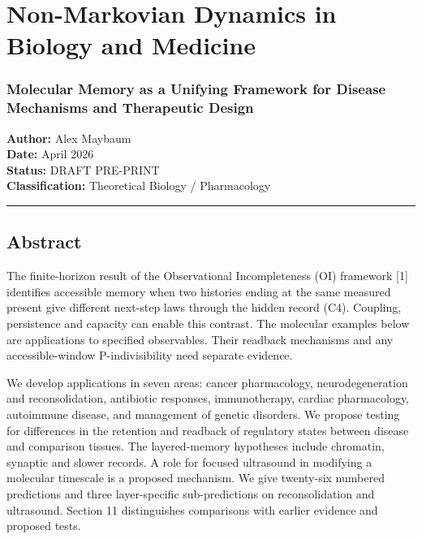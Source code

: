 \documentclass[
]{article}
\author{}
\date{}
\begin{document}
\hypertarget{non-markovian-dynamics-in-biology-and-medicine}{%
\section{Non-Markovian Dynamics in Biology and
Medicine}\label{non-markovian-dynamics-in-biology-and-medicine}}

\hypertarget{molecular-memory-as-a-unifying-framework-for-disease-mechanisms-and-therapeutic-design}{%
\subsubsection{Molecular Memory as a Unifying Framework for Disease
Mechanisms and Therapeutic
Design}\label{molecular-memory-as-a-unifying-framework-for-disease-mechanisms-and-therapeutic-design}}

\textbf{Author:} Alex Maybaum\\
\textbf{Date:} April 2026\\
\textbf{Status:} DRAFT PRE-PRINT\\
\textbf{Classification:} Theoretical Biology / Pharmacology

\begin{center}\rule{0.5\linewidth}{0.5pt}\end{center}

\hypertarget{abstract}{%
\subsection{Abstract}\label{abstract}}

The finite-horizon result of the Observational Incompleteness (OI)
framework {[}1{]} identifies accessible memory when two histories ending
at the same measured present give different next-step laws through the
hidden record (C4). Coupling, persistence and capacity can enable this
contrast. The molecular examples below are applications to specified
observables. Their readback mechanisms and any accessible-window
P-indivisibility need separate evidence.

We develop applications in seven areas: cancer pharmacology,
neurodegeneration and reconsolidation, antibiotic responses,
immunotherapy, cardiac pharmacology, autoimmune disease, and management
of genetic disorders. We propose testing for differences in the
retention and readback of regulatory states between disease and
comparison tissues. The layered-memory hypotheses include chromatin,
synaptic and slower records. A role for focused ultrasound in modifying
a molecular timescale is a proposed mechanism. We give twenty-six
numbered predictions and three layer-specific sub-predictions on
reconsolidation and ultrasound. Section 11 distinguishes comparisons
with earlier evidence and proposed tests.
\end{document}

